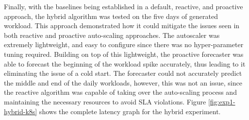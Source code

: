 \begin{center}
\begin{minipage}{\linewidth}
    \label{fig:exp1-hybrid-k8s}
\end{minipage}
\end{center}

Finally, with the baselines being established in a default, reactive, and proactive approach, the hybrid algorithm was tested on the five days of generated workload. This approach demonstrated how it could mitigate the issues seen in both reactive and proactive auto-scaling approaches. The autoscaler was extremely lightweight, and easy to configure since there was no hyper-parameter tuning required. Building on top of this lightweight, the proactive forecaster was able to forecast the beginning of the workload spike accurately, thus leading to it eliminating the issue of a cold start. The forecaster could not accurately predict the middle and end of the daily workloads, however, this was not an issue, since the reactive algorithm was capable of taking over the auto-scaling process and maintaining the necessary resources to avoid SLA violations. Figure \ref{fig:exp1-hybrid-k8s} shows the complete latency graph for the hybrid experiment.\par

